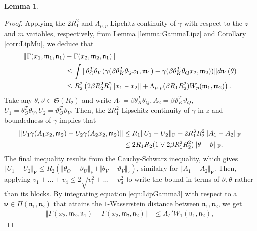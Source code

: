 \documentclass{article}
\newtheorem{lemma}[theorem]{Lemma}
\begin{document}
\begin{appendices}
\begin{lemma}
\end{lemma}
\begin{proof}
Applying the $2R_1^2$ and $\Lambda_{\mu,p}$-Lipchitz continuity of $\gamma$ with respect to the $z$ and $m$ variables, respectively, from Lemma \ref{lemma:GammaLipz} and Corollary \ref{corr:LipMu}, we deduce that
   \begin{align}\label{eqn:LipGamma1}
       \Vert\Gamma(x_1,\mathfrak{m}_1,\mathfrak{n}_1)&-\Gamma(x_2,\mathfrak{m}_2,\mathfrak{n}_1)\Vert\\& \le \int \Vert \theta_O^T\theta_V (\gamma(\beta \theta_K^T\theta_Qx_1,\mathfrak{m}_1)-\gamma(\beta \theta_K^T\theta_Qx_2,\mathfrak{m}_2))\Vert d\mathfrak{n}_1(\theta)\notag\\
       & \le R_2^2\left(2\beta R_2^2R_1^2\Vert x_1-x_2\Vert+ \Lambda_{\mu,p}(\beta R_1R_2^2) W_p(\mathfrak m_1,\mathfrak m_2)\right).\notag
   \end{align}
   Take any $\theta,\vartheta \in \mathfrak{S}(R_2)$ and write $A_1=\beta \theta_K^T\theta_Q,A_2=\beta \vartheta_K^T\vartheta_Q$,  $U_1=\theta_O^T\theta_V, U_2=\vartheta_O^T\vartheta_V$. Then, the $2R^2_1$-Lipschitz continuity of $\gamma$ in $z$ and boundedness of $\gamma$ implies that
    \begin{align}\label{eqn:LipGamma3}
      \left\Vert U_1 \gamma(A_1 x_2,\mathfrak{m}_2)-U_2\gamma(A_2x_2,\mathfrak{m}_2)\right\Vert 
      & \le R_1 \Vert U_1-U_2 \Vert_\mathrm{F}+2R^3_1R_2^2\Vert A_1-A_2\Vert_\mathrm{F}\\
      & \le 2R_1R_2(1\vee 2\beta R_1^2R_2^2) \Vert \theta-\vartheta\Vert_\mathrm{F}.\notag
    \end{align}
    The final inequality results from the Cauchy-Schwarz inequality, which gives \\$\Vert U_1-U_2\Vert_\mathrm{F}\le R_2(\Vert \theta_O-\vartheta_U\Vert_\mathrm{F}+\Vert \theta_V-\vartheta_V\Vert_\mathrm{F})$, similalry for $\Vert A_1-A_2\Vert_\mathrm{F}$. Then, applying $v_1+\ldots+ v_4\le 2\sqrt{v_1^2+\ldots+v_4^2}$ to write the bound in terms of $\vartheta,\theta$ rather than its blocks. By integrating equation \eqref{eqn:LipGamma3} with respect to a $\bm \nu\in \Pi(\mathfrak{n}_1,\mathfrak{n}_2)$ that attains the $1$-Wasserstein distance between $\mathfrak{n}_1,\mathfrak{n}_2$, we get
    \begin{align}\label{eqn:LipGamma2}
\Vert\Gamma(x_2,\mathfrak{m}_2,\mathfrak{n}_1)-\Gamma(x_2,\mathfrak{m}_2,\mathfrak{n}_2)\Vert& \le \Lambda_\Gamma'W_1 (\mathfrak{n}_1,\mathfrak{n}_2),
    \end{align}

\end{proof}
\end{appendices}
\end{document}
